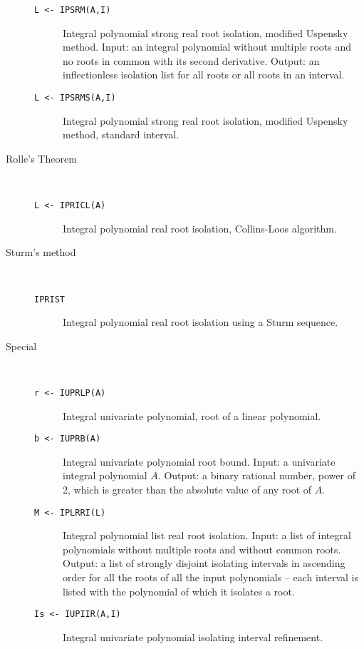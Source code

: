 \begin{description}
\begin{description}
\item[{\tt L <- IPSRM(A,I) 
}]  Integral polynomial strong real root isolation, modified Uspensky
       method. Input: an integral polynomial without multiple roots and no roots
       in common with its second derivative. Output: an inflectionless isolation
       list for all roots or all roots in an interval.

\item[{\tt L <- IPSRMS(A,I) 
}] Integral polynomial strong real root isolation, modified Uspensky
       method, standard interval.
\end{description}

\item[Rolle's Theorem] \ \
\begin{description}
\item[{\tt L <- IPRICL(A) 
}] Integral polynomial real root isolation, Collins-Loos algorithm.
\end{description}

\item[Sturm's method] \ \
\begin{description}
\item[{\tt IPRIST}] Integral polynomial real root isolation using a Sturm sequence.
\end{description}

\item[Special] \ \
\begin{description}
\item[{\tt r <- IUPRLP(A) 
}]\index{IUPRLP} Integral univariate polynomial, root of a linear polynomial.
\item[{\tt b <- IUPRB(A) 
}]\index{IUPRB}  Integral univariate polynomial root bound.
              Input: a univariate integral polynomial $A$.
              Output: a binary rational number, power of 2, which is greater than
                      the absolute value of any root of $A$.
\item[{\tt M <- IPLRRI(L) 
}]\index{IPLRRI} Integral polynomial list real root isolation.
              Input: a list of integral polynomials without multiple roots and
                     without common roots.
              Output: a list of strongly disjoint isolating intervals in ascending order
                      for all the roots of all the input polynomials -- each
                      interval is listed with the polynomial of which it isolates a root.
\item[{\tt Is <- IUPIIR(A,I)
}]\index{IUPIIR}  Integral univariate polynomial isolating interval
    refinement.
\end{description}


\end{description}
